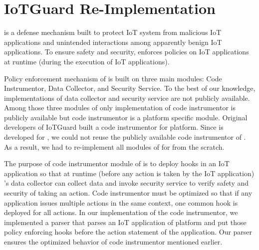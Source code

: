 \section{IoTGuard Re-Implementation}

\iotguard is a defense mechanism built to protect IoT system from malicious IoT applications and unintended interactions among apparently benign IoT applications. To ensure safety and security, \iotguard enforces policies on IoT applications at runtime (during the execution of IoT applications).

Policy enforcement mechanism of \iotguard is built on three main modules: Code Instrumentor, Data Collector, and Security Service.
To the best of our knowledge, implementations of data collector and security service are not publicly available.
Among those three modules of \iotguard only implementation of code instrumentor is publicly available but code instrumentor is a platform specific module.
Original developers of IoTGuard built a code instrumentor for \smt platform.
Since \sysname is developed for \oh, we could not reuse the publicly available code instrumentor of \iotguard.
As a result, we had to re-implement all modules of \iotguard for \oh from the scratch.

The purpose of code instrumentor module of \iotguard is to deploy hooks in an IoT application so that at runtime
(before any action is taken by the IoT application)
\iotguard's data collector can collect data and invoke security service to verify safety and security of taking an action.
Code instrumentor must be optimized so that if any application issues multiple actions in the same context, one common hook is deployed for all actions.
In our implementation of the code instrumentor, we implemented a parser that parses an IoT application of \oh platform and put those policy enforcing hooks before the action statement of the application.
Our parser ensures the optimized behavior of code instrumentor mentioned earlier.



